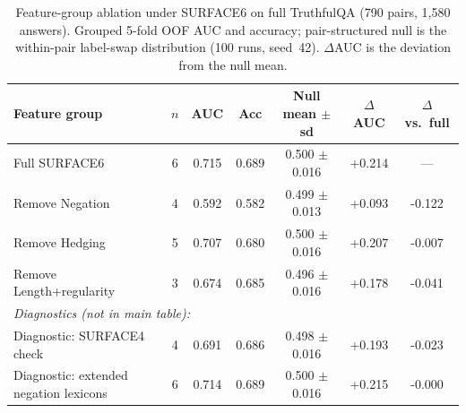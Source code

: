 \begin{table}[t]
\centering
\small
\caption{Feature-group ablation under SURFACE6 on full TruthfulQA (790 pairs, 1{,}580 answers). Grouped 5-fold OOF AUC and accuracy; pair-structured null is the within-pair label-swap distribution (100 runs, seed~42). $\Delta$AUC is the deviation from the null mean.}
\label{tab:surface6_ablation}
\begin{tabular}{lcccccc}
\toprule
Feature group & $n$ & AUC & Acc & Null mean $\pm$ sd & $\Delta$AUC & $\Delta$ vs.\ full \\
\midrule
Full SURFACE6 & 6 & 0.715 & 0.689 & 0.500 $\pm$ 0.016 & +0.214 & --- \\
Remove Negation & 4 & 0.592 & 0.582 & 0.499 $\pm$ 0.013 & +0.093 & -0.122 \\
Remove Hedging & 5 & 0.707 & 0.680 & 0.500 $\pm$ 0.016 & +0.207 & -0.007 \\
Remove Length+regularity & 3 & 0.674 & 0.685 & 0.496 $\pm$ 0.016 & +0.178 & -0.041 \\
\midrule
\multicolumn{7}{l}{\textit{Diagnostics (not in main table):}} \\
Diagnostic: SURFACE4 check & 4 & 0.691 & 0.686 & 0.498 $\pm$ 0.016 & +0.193 & -0.023 \\
Diagnostic: extended negation lexicons & 6 & 0.714 & 0.689 & 0.500 $\pm$ 0.016 & +0.215 & -0.000 \\
\bottomrule
\end{tabular}
\end{table}
